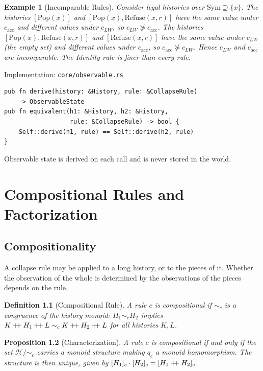 \documentclass[12pt,oneside,openany]{book}
\theoremstyle{spherepop}
\newtheorem{definition}{Definition}[chapter]
\newtheorem{proposition}[definition]{Proposition}
\theoremstyle{remarkstyle}
\newtheorem{example}[definition]{Example}
\newcommand{\Pop}{\mathrm{Pop}}
\newcommand{\Rfuse}{\mathrm{Refuse}}
\newcommand{\hconcat}{\mathbin{+\mkern-5mu+}}
\newcommand{\calH}{\mathcal{H}}
\newcommand{\Sym}{\mathrm{Sym}}
\begin{document}
\begin{example}[Incomparable Rules]
\label{ex:incomparable}
Consider legal histories over $\Sym\supseteq\{x\}$. The histories $[\Pop(x)]$ and $[\Pop(x),\Rfuse(x,r)]$ have the same value under $c_{\mathrm{acc}}$ and different values under $c_{LW}$, so $c_{LW}\not\succeq c_{\mathrm{acc}}$. The histories $[\Pop(x),\Rfuse(x,r)]$ and $[\Rfuse(x,r)]$ have the same value under $c_{LW}$ (the empty set) and different values under $c_{\mathrm{acc}}$, so $c_{\mathrm{acc}}\not\succeq c_{LW}$. Hence $c_{LW}$ and $c_{\mathrm{acc}}$ are incomparable. The Identity rule is finer than every rule.
\end{example}

\begin{implbox}{Implementation: \texttt{core/observable.rs}}
\begin{lstlisting}
pub fn derive(history: &History, rule: &CollapseRule)
    -> ObservableState
pub fn equivalent(h1: &History, h2: &History,
                  rule: &CollapseRule) -> bool {
    Self::derive(h1, rule) == Self::derive(h2, rule)
}
\end{lstlisting}
Observable state is derived on each call and is never stored in the world.
\end{implbox}

\chapter{Compositional Rules and Factorization}
\label{ch:compositional}

\section{Compositionality}

A collapse rule may be applied to a long history, or to the pieces of it. Whether the observation of the whole is determined by the observations of the pieces depends on the rule.

\begin{definition}[Compositional Rule]
A rule $c$ is \emph{compositional} if $\sim_c$ is a congruence of the history monoid: $H_1\sim_cH_2$ implies $K\hconcat H_1\hconcat L\sim_cK\hconcat H_2\hconcat L$ for all histories $K,L$.
\end{definition}

\begin{proposition}[Characterization]
\label{prop:congruence}
A rule $c$ is compositional if and only if the set $\calH/{\sim_c}$ carries a monoid structure making $q_c$ a monoid homomorphism. The structure is then unique, given by $[H_1]_c\cdot[H_2]_c=[H_1\hconcat H_2]_c$.
\end{proposition}
\end{document}
